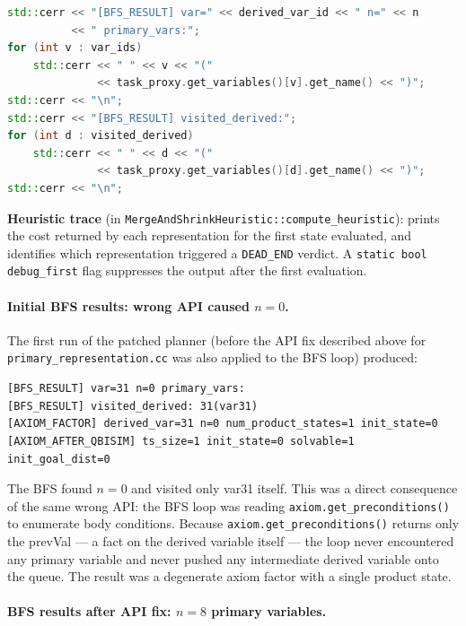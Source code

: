 \documentclass[11pt,a4paper]{article}
\begin{document}
\begin{lstlisting}[language=C++, caption={BFS result patch (fts\_factory.cc)}]
std::cerr << "[BFS_RESULT] var=" << derived_var_id << " n=" << n
          << " primary_vars:";
for (int v : var_ids)
    std::cerr << " " << v << "("
              << task_proxy.get_variables()[v].get_name() << ")";
std::cerr << "\n";
std::cerr << "[BFS_RESULT] visited_derived:";
for (int d : visited_derived)
    std::cerr << " " << d << "("
              << task_proxy.get_variables()[d].get_name() << ")";
std::cerr << "\n";
\end{lstlisting}

\textbf{Heuristic trace} (in \texttt{MergeAndShrinkHeuristic::compute\_heuristic}):
prints the cost returned by each representation for the first state evaluated,
and identifies which representation triggered a \texttt{DEAD\_END} verdict.  A
\texttt{static bool debug\_first} flag suppresses the output after the first
evaluation.

\paragraph{Initial BFS results: wrong API caused $n = 0$.}

The first run of the patched planner (before the API fix described above for
\texttt{primary\_representation.cc} was also applied to the BFS loop) produced:

\begin{lstlisting}
[BFS_RESULT] var=31 n=0 primary_vars:
[BFS_RESULT] visited_derived: 31(var31)
[AXIOM_FACTOR] derived_var=31 n=0 num_product_states=1 init_state=0
[AXIOM_AFTER_QBISIM] ts_size=1 init_state=0 solvable=1 init_goal_dist=0
\end{lstlisting}

The BFS found $n = 0$ and visited only var31 itself.  This was a direct
consequence of the same wrong API: the BFS loop was reading
\texttt{axiom.get\_preconditions()} to enumerate body conditions.  Because
\texttt{axiom.get\_preconditions()} returns only the prevVal — a fact on the
derived variable itself — the loop never encountered any primary variable and
never pushed any intermediate derived variable onto the queue.  The result was
a degenerate axiom factor with a single product state.

\paragraph{BFS results after API fix: $n = 8$ primary variables.}
\end{document}
